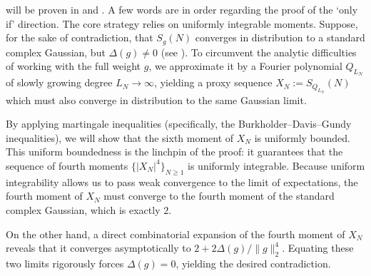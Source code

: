 \documentclass[12pt]{amsart}
\renewcommand{\geq}{\geqslant}
\numberwithin{equation}{section}
\theoremstyle{plain}
\theoremstyle{definition}
\begin{document}
	 will be proven in  and . A few words are in order regarding the proof of the `only if' direction. The core strategy relies on uniformly integrable moments. Suppose, for the sake of contradiction, that $S_g(N)$ converges in distribution to a standard complex Gaussian, but $\Delta(g) \neq 0$ (see ). To circumvent the analytic difficulties of working with the full weight $g$, we approximate it by a Fourier polynomial $Q_{L_N}$ of slowly growing degree $L_N \to \infty$, yielding a proxy sequence $X_N := S_{Q_{L_N}}(N)$ which must also converge in distribution to the same Gaussian limit. 
	
	By applying martingale inequalities (specifically, the Burkholder--Davis--Gundy inequalities), we will show that the sixth moment of $X_N$ is uniformly bounded. This uniform boundedness is the linchpin of the proof: it guarantees that the sequence of fourth moments $\{|X_N|^4\}_{N \geq 1}$ is uniformly integrable. Because uniform integrability allows us to pass weak convergence to the limit of expectations, the fourth moment of $X_N$ must converge to the fourth moment of the standard complex Gaussian, which is exactly $2$. 
	
	On the other hand, a direct combinatorial expansion of the fourth moment of $X_N$ reveals that it converges asymptotically to $2 + 2\Delta(g)/\|g\|_2^4$. Equating these two limits rigorously forces $\Delta(g) = 0$, yielding the desired contradiction.
	
\end{document}
